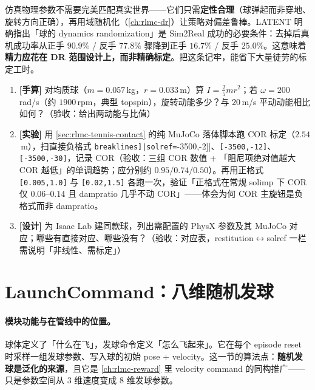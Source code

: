 \begin{insight}\label{ins:rlmc-tennis-dr}
仿真物理参数不需要完美匹配真实世界——它们只需\textbf{定性合理}（球弹起而非穿地、旋转方向正确），再用域随机化（\cref{ch:rlmc-dr}）让策略对偏差鲁棒。LATENT 明确指出「球的 dynamics randomization」是 Sim2Real 成功的必要条件：去掉后真机成功率从正手 $90.9\%$ / 反手 $77.8\%$ 骤降到正手 $16.7\%$ / 反手 $25.0\%$\cite{tennis_latent2026}。这意味着\textbf{精力应花在 DR 范围设计上，而非精确标定}。把这条记牢，能省下大量徒劳的标定工时。
\end{insight}

\begin{practice}[本节动手任务]
\begin{enumerate}
  \item \textbf{[手算]} 对均质球（$m=0.057$\,kg，$r=0.033$\,m）算 $I=\tfrac{2}{5}mr^2$；若 $\omega=200$\,rad/s（约 $1900$\,rpm，典型 topspin），旋转动能多少？与 $20$\,m/s 平动动能相比如何？（验收：给出两动能与比值）
  \item \textbf{[实验]} 用 \cref{sec:rlmc-tennis-contact} 的纯 MuJoCo 落体脚本跑 COR 标定（$2.54$\,m），扫直接负格式 \Verb[breaklines]|solref=[-3500,-2]|、\verb|[-3500,-12]|、\verb|[-3500,-30]|，记录 COR（验收：三组 COR 数值 + 「阻尼项绝对值越大 COR 越低」的单调趋势；应分别约 $0.95/0.74/0.50$）。再用正格式 \verb|[0.005,1.0]| 与 \verb|[0.02,1.5]| 各跑一次，验证「正格式在常规 solimp 下 COR 仅 $0.06$--$0.14$ 且 dampratio 几乎不动 COR」——体会为何 COR 主旋钮是负格式而非 dampratio。
  \item \textbf{[设计]} 为 Isaac Lab 建同款球，列出需配置的 PhysX 参数及其 MuJoCo 对应；哪些有直接对应、哪些没有？（验收：对应表，restitution$\leftrightarrow$solref 一栏需说明「非线性、需标定」）
\end{enumerate}
\end{practice}

\section{LaunchCommand：八维随机发球}
\label{sec:rlmc-tennis-launch}

\paragraph{模块功能与在管线中的位置。}球体定义了「什么在飞」，发球命令定义「怎么飞起来」。它在每个 episode reset 时采样一组发球参数、写入球的初始 pose + velocity。这一节的算法点：\textbf{随机发球是泛化的来源}，且它是 \cref{ch:rlmc-reward} 里 velocity command 的同构推广——只是参数空间从 $3$ 维速度变成 $8$ 维发球参数。

